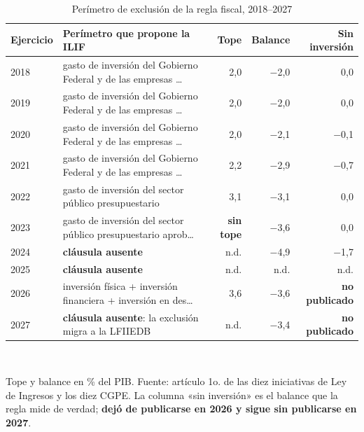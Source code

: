 \begin{table}[htbp]\centering\footnotesize
\caption{Perímetro de exclusión de la regla fiscal, 2018--2027}\label{cua:regla}
\begin{tabular}{llrrr}
\toprule
Ejercicio & Perímetro que propone la ILIF & Tope & Balance & Sin inversión \\
\midrule
2018 & gasto de inversión del Gobierno Federal y de las empresas … & 2,0 & $-$2,0 & 0,0 \\
2019 & gasto de inversión del Gobierno Federal y de las empresas … & 2,0 & $-$2,0 & 0,0 \\
2020 & gasto de inversión del Gobierno Federal y de las empresas … & 2,0 & $-$2,1 & $-$0,1 \\
2021 & gasto de inversión del Gobierno Federal y de las empresas … & 2,2 & $-$2,9 & $-$0,7 \\
2022 & gasto de inversión del sector público presupuestario & 3,1 & $-$3,1 & 0,0 \\
2023 & gasto de inversión del sector público presupuestario aprob… & \textbf{sin tope} & $-$3,6 & 0,0 \\
2024 & \textbf{cláusula ausente} & n.d. & $-$4,9 & $-$1,7 \\
2025 & \textbf{cláusula ausente} & n.d. & n.d. & n.d. \\
2026 & inversión física + inversión financiera + inversión en des… & 3,6 & $-$3,6 & \textbf{no publicado} \\
2027 & \textbf{cláusula ausente}: la exclusión migra a la LFIIEDB & n.d. & $-$3,4 & \textbf{no publicado} \\
\bottomrule
\end{tabular}
\\[2pt]\begin{minipage}{0.92\textwidth}\scriptsize Tope y balance en \% del PIB. Fuente: artículo 1o. de las diez iniciativas de Ley de Ingresos y los diez CGPE. La columna «sin inversión» es el balance que la regla mide de verdad; \textbf{dejó de publicarse en 2026 y sigue sin publicarse en 2027}.\end{minipage}
\end{table}
